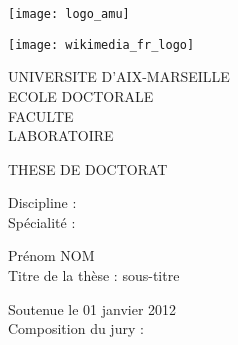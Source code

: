 \titlepage

\selectfont{} %

\vspace*{-2cm}
\begin{center}
	\begin{minipage}[c]{0.25\linewidth}
		\raggedright \texttt{[image: logo\_amu]}
	\end{minipage}\hfill
	\begin{minipage}[c]{0.25\linewidth}
		\raggedleft \texttt{[image: wikimedia\_fr\_logo]}
	\end{minipage}\hfill 
\end{center}

\begin{flushleft}
        \vspace{0.2cm}
    \LARGE UNIVERSITE D’AIX-MARSEILLE\\
        \vspace{0.2cm}
    \Large ECOLE DOCTORALE\\
        \vspace{0.2cm}
    \normalsize FACULTE\\
        \vspace{0.2cm}
    LABORATOIRE\\
    \begin{center}
        \vspace{2cm}
    THESE DE DOCTORAT\\
    \end{center}
        \vspace{0.5cm}
    Discipline :\\
    Spécialité :\\
    \begin{center}
        \vspace{0.5cm}
    \Large Prénom NOM\\
        \vspace{1cm}
    \large Titre de la thèse : sous-titre\\
    \end{center}
        \vspace{3cm}
    \normalsize Soutenue le 01 janvier 2012\\
        \vspace{0.4cm}
    Composition du jury :\\
\end{flushleft}

\vspace{0.4cm}

